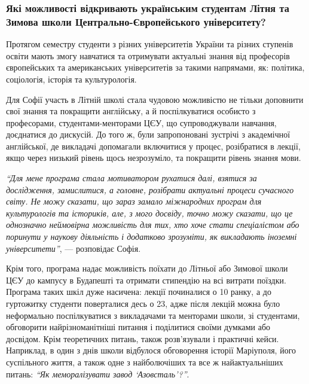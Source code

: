 
\subsubsection{Які можливості відкривають українським студентам Літня та Зимова школи Центрально-Європейського університету?}

Протягом семестру студенти з різних університетів України та різних ступенів
освіти мають змогу навчатися та отримувати актуальні знання від професорів
європейських та американських університетів за такими напрямами, як: політика,
соціологія, історія та культурологія.


Для Софії участь в Літній школі стала чудовою можливістю не тільки доповнити
свої знання та покращити англійську, а й поспілкуватися особисто з професорами,
студентами-менторами ЦЄУ, що супроводжували навчання, доєднатися до дискусій.
До того ж, були запропоновані зустрічі з академічної англійської, де викладачі
допомагали включитися у процес, розібратися в лекції, якщо через низький рівень
щось незрозуміло, та покращити рівень знання мови.


\begin{leftbar}
\emph{\enquote{Для мене програма стала мотиватором рухатися далі, взятися за дослідження,
замислитися, а головне, розібрати актуальні процеси сучасного світу. Не можу
сказати, що зараз замало міжнародних програм для культурологів та істориків,
але, з мого досвіду, точно можу сказати, що це однозначно неймовірна можливість
для тих, хто хоче стати спеціалістом або поринути у наукову діяльність і
додатково зрозуміти, як викладають іноземні університети}}, — розповідає Софія.
\end{leftbar}



Крім того, програма надає можливість поїхати до Літньої або Зимової школи ЦЄУ
до кампусу в Будапешті та отримати стипендію на всі витрати поїздки. Програма
таких шкіл дуже насичена: лекції починалися о 10 ранку, а до гуртожитку
студенти поверталися десь о 23, адже після лекцій можна було неформально
поспілкуватися з викладачами та менторами школи, зі студентами, обговорити
найрізноманітніші питання і поділитися своїми думками або досвідом. Крім
теоретичних питань, також розв'язували і практичні кейси. Наприклад, в один з
днів школи відбулося обговорення історії Маріуполя, його суспільного життя, а
також одне з найболючіших та все ж найактуальніших питань: \emph{\enquote{Як меморалізувати
завод \enquote{Азовсталь}?}}.

